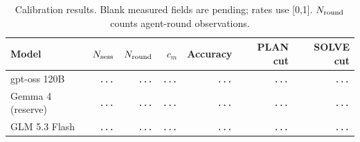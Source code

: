 \begin{table}[H]
\centering\footnotesize
\setlength{\tabcolsep}{4pt}
\caption{Calibration results. Blank measured fields are pending; rates use [0,1]. $N_{\rm round}$ counts agent-round observations.}
\label{tab:calibration-results}
\begin{tabular}{@{}lrrrrrr@{}}
\toprule
Model & $N_{\rm sess}$ & $N_{\rm round}$ & $c_m$ & Accuracy & PLAN cut & SOLVE cut \\
\midrule
gpt-oss 120B & {\color{gray}\texttt{...}} & {\color{gray}\texttt{...}} & {\color{gray}\texttt{...}} & {\color{gray}\texttt{...}} & {\color{gray}\texttt{...}} & {\color{gray}\texttt{...}} \\
Gemma 4 (reserve) & {\color{gray}\texttt{...}} & {\color{gray}\texttt{...}} & {\color{gray}\texttt{...}} & {\color{gray}\texttt{...}} & {\color{gray}\texttt{...}} & {\color{gray}\texttt{...}} \\
GLM 5.3 Flash & {\color{gray}\texttt{...}} & {\color{gray}\texttt{...}} & {\color{gray}\texttt{...}} & {\color{gray}\texttt{...}} & {\color{gray}\texttt{...}} & {\color{gray}\texttt{...}} \\
\bottomrule
\end{tabular}
\end{table}
